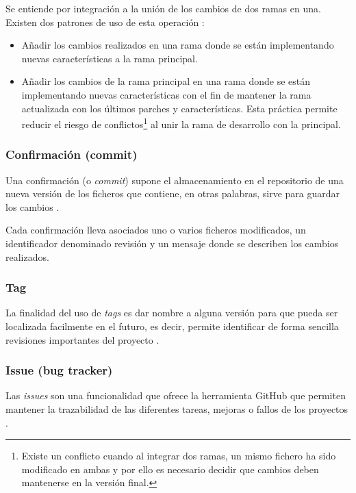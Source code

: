 Se entiende por integración a la unión de los cambios de dos ramas en una. Existen dos patrones de uso de esta operación \cite{sbf5:git3}:

\begin{itemize}
	\item Añadir los cambios realizados en una rama donde se están implementando nuevas características a la rama principal.
	\item Añadir los cambios de la rama principal en una rama donde se están implementando nuevas características con el fin de mantener la rama actualizada con los últimos parches y características. Esta práctica permite reducir el riesgo de conflictos\footnote{Existe un conflicto cuando al integrar dos ramas, un mismo fichero ha sido modificado en ambas y por ello es necesario decidir que cambios deben mantenerse en la versión final.} al unir la rama de desarrollo con la principal.
\end{itemize}


\subsubsection{Confirmación (commit)}

Una confirmación (o \emph{commit}) supone el almacenamiento en el repositorio de una nueva versión de los ficheros que contiene, en otras palabras, sirve para guardar los cambios \cite{Chacon:2014:PG:2695634}.

Cada confirmación lleva asociados uno o varios ficheros modificados, un identificador denominado revisión y un mensaje donde se describen los cambios realizados.

\subsubsection{Tag}

La finalidad del uso de \emph{tags} es dar nombre a alguna versión para que pueda ser localizada facilmente en el futuro, es decir, permite identificar de forma sencilla revisiones importantes del proyecto \cite{wiki:002}.

\subsubsection{Issue (bug tracker)}

Las \emph{issues} son una funcionalidad que ofrece la herramienta GitHub que permiten mantener la trazabilidad de las diferentes tareas, mejoras o fallos de los proyectos \cite{github:issues}.

